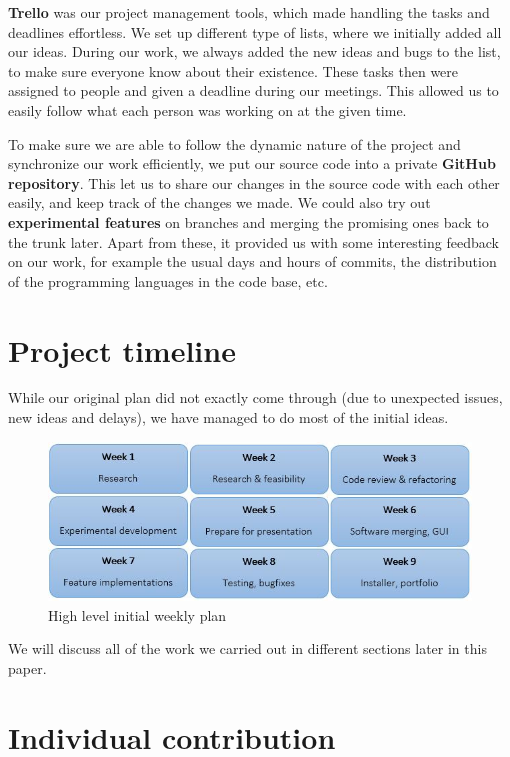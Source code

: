 \documentclass[a4paper, 11pt, article]{report}
\begin{document}
\textbf{Trello} was our project management tools, which made handling the tasks and deadlines effortless. We set up different type of lists, where we initially added all our ideas. During our work, we always added the new ideas and bugs to the list, to make sure everyone know about their existence. These tasks then were assigned to people and given a deadline during our meetings. This allowed us to easily follow what each person was working on at the given time.

To make sure we are able to follow the dynamic nature of the project and synchronize our work efficiently, we put our source code into a private \textbf{GitHub repository}. This let us to share our changes in the source code with each other easily, and keep track of the changes we made. We could also try out \textbf{experimental features} on branches and merging the promising ones back to the trunk later. Apart from these, it provided us with some interesting feedback on our work, for example the usual days and hours of commits, the distribution of the programming languages in the code base, etc.

\section{Project timeline}

While our original plan did not exactly come through (due to unexpected issues, new ideas and delays), we have managed to do most of the initial ideas.

\begin{figure}[H]
\includegraphics[width=12.8cm]{images/weeklyplan}
\caption{High level initial weekly plan}
\centering
\end{figure}

We will discuss all of the work we carried out in different sections later in this paper.

\section{Individual contribution}
\end{document}
